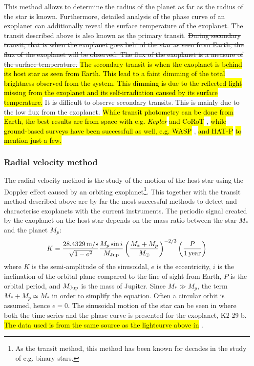 This method allows to determine the radius of the planet as far as the radius of the star is known.
Furthermore, detailed analysis of the phase curve of an exoplanet can additionally reveal the
surface temperature of the exoplanet. The transit described above is also known as the primary
transit. \st{During secondary transit, that is when the exoplanet goes behind the star as seen from
Earth, the flux of the exoplanet will be observed. The flux of the exoplanet is a measure of the
surface temperature.} \hl{The secondary transit is when the exoplanet is behind its host star as
seen from Earth. This lead to a faint dimming of the total brightness observed from the system. This
dimming is due to the reflected light missing from the exoplanet and its self-irradiation caused by
its surface temperature.} It is difficult to observe secondary transits. This is mainly due to the
low flux from the exoplanet. \hl{While transit photometry can be done from Earth, the best results
are from space with e.g. \emph{Kepler}} \citep{Borucki2010} \hl{and CoRoT} \citep{Baglin2006},
\hl{while ground-based surveys have been successfull as well, e.g. WASP} \citep{Pollacco2006},
\hl{and HAT-P} \citep{Bakos2004} \hl{to mention just a few.}



\subsubsection{Radial velocity method}
\label{sec:rvmethod}

The radial velocity method is the study of the motion of the host star using the Doppler effect
caused by an orbiting exoplanet\footnote{As the transit method, this method has been known for
decades in the study of e.g. binary stars.}. This together with the transit method described above
are by far the most successful methods to detect and characterise exoplanets  with the current
instruments. The periodic signal created by the exoplanet on the host star depends on the mass ratio
between the star $M_\ast$ and the planet $M_p$:
\begin{align}
  K = \frac{\SI{28.4329}{m/s}}{\sqrt{1-e^2}} \frac{M_p\sin i}{M_\mathrm{Jup}} \left( \frac{M_\ast+M_p}{M_\odot} \right)^{-2/3} \left(\frac{P}{\SI{1}{year}}\right)  \label{eq:rv}
\end{align}
where $K$ is the semi-amplitude of the sinusoidal, $e$ is the eccentricity, $i$ is the inclination
of the orbital plane compared to the line of sight from Earth, $P$ is the orbital period, and
$M_\mathrm{Jup}$ is the mass of Jupiter. Since $M_\ast \gg M_p$, the term $M_\ast+M_p\simeq M_\ast$ in order
to simplify the equation. Often a circular orbit is assumed, hence $e=0$. The sinusoidal motion of
the star can be seen in  where both the time series and the phase curve is
presented for the exoplanet, K2-29 b. \hl{The data used is from the same source as the lightcurve
above in} .

